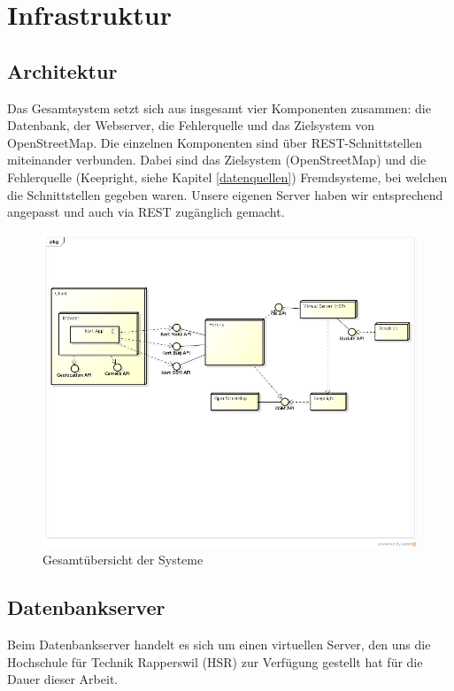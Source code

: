 \chapter{Infrastruktur}
\label{infrastruktur}

\section{Architektur}

Das Gesamtsystem setzt sich aus insgesamt vier Komponenten zusammen: die Datenbank, der Webserver, die Fehlerquelle und das Zielsystem von OpenStreetMap. 
Die einzelnen Komponenten sind über \gls{REST}-Schnittstellen miteinander verbunden. 
Dabei sind das Zielsystem (OpenStreetMap) und die Fehlerquelle (Keepright, siehe Kapitel \ref{datenquellen}) Fremdsysteme, bei welchen die Schnittstellen gegeben waren. 
Unsere eigenen Server haben wir entsprechend angepasst und auch via REST zugänglich gemacht.

\begin{figure}[H]
	\centering
	\includegraphics[width=\textwidth]{images/uml/deployment_diagram}
	\caption{Gesamtübersicht der Systeme}
	\label{deplyoyment-diagram}
\end{figure}


\section{Datenbankserver}

Beim Datenbankserver handelt es sich um einen virtuellen Server, den uns die Hochschule für Technik Rapperswil (HSR) zur Verfügung gestellt hat für die Dauer dieser Arbeit.

